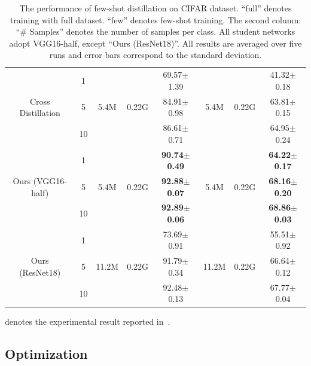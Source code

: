 \documentclass[letterpaper]{article} %
\begin{document}
{{\begin{table}[ht]
\begin{threeparttable}
{\begin{tabular}{c|c|ccc|ccc}
        \hline
                & 1     &         &         & 69.57$\pm$1.39          &         &         & 41.32$\pm$0.18 \\
        Cross Distillation
                & 5     & 5.4M    & 0.22G   & 84.91$\pm$0.98          & 5.4M    & 0.22G   & 63.81$\pm$0.15 \\
                & 10    &         &         & 86.61$\pm$0.71          &         &         & 64.95$\pm$0.24 \\
        \hline
                & 1     &         &         & \textbf{90.74$\pm$0.49}          &         &         & \textbf{64.22$\pm$0.17} \\
        Ours (VGG16-half)
                & 5     & 5.4M    & 0.22G   & \textbf{92.88$\pm$0.07}          & 5.4M    & 0.22G   & \textbf{68.16$\pm$0.20} \\
                & 10    &         &         & \textbf{92.89$\pm$0.06} &         &         & \textbf{68.86$\pm$0.03} \\
        \hline
                & 1     &         &         & 73.69$\pm$0.91          &         &         & 55.51$\pm$0.92 \\
        Ours (ResNet18)
                & 5     & 11.2M   & 0.22G   & 91.79$\pm$0.34          & 11.2M   & 0.22G   & 66.64$\pm$0.12 \\
                & 10    &         &         & 92.48$\pm$0.13          &         &         & 67.77$\pm$0.04 \\
        \hline
        \end{tabular}
        }
    \begin{tablenotes}
    \item[$\dag$] denotes the experimental result reported in~\cite{li2018few}.
    \end{tablenotes}

    \caption{The performance of few-shot distillation on CIFAR dataset.
            ``full'' denotes training with full dataset. ``few'' denotes few-shot training.
            The second column: ``\# Samples'' denotes the number of samples per class. All student networks adopt VGG16-half, except ``Ours (ResNet18)''.
            All results are averaged over five runs and error bars correspond to the standard deviation.}
    \label{table:cifar}
    \end{threeparttable}
    \end{table}
}

    \subsection{Optimization}
    {


}}
\end{document}
